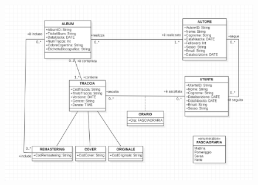 \documentclass[11pt]{article}
\begin{document}
	\begin{figure}[h]
		\centering
		\includegraphics[width=1.2\linewidth]{SpotifyPezzotto.png}
	\end{figure}

	\clearpage
\end{document}
